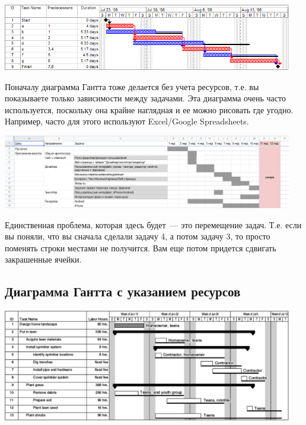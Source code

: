 \documentclass{../../text-style}
\begin{document}
\begin{center}
    \includegraphics[width=0.95\textwidth]{ganttChart.png}
\end{center}

Поначалу диаграмма Гантта тоже делается без учета ресурсов, т.е. вы показываете только зависимости между задачами. Эта диаграмма очень часто используется, поскольку она крайне наглядная и ее можно рисовать где угодно. Например, часто для этого используют Excel/Google Spreadsheets. 

\begin{center}
    \includegraphics[width=0.95\textwidth]{ganttChartExample.png}
\end{center}

Единственная проблема, которая здесь будет~--- это перемещение задач. Т.е. если вы поняли, что вы сначала сделали задачу 4, а потом задачу 3, то просто поменять строки местами не получится. Вам еще потом придется сдвигать закрашенные ячейки.

\subsection{Диаграмма Гантта с указанием ресурсов}

\begin{center}
    \includegraphics[width=0.95\textwidth]{ganttChartWithResources.png}
\end{center}
\end{document}
